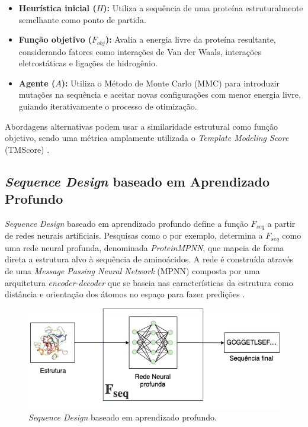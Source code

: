 \begin{itemize}
    \item \textbf{Heurística inicial ($H$):}  
    Utiliza a sequência de uma proteína estruturalmente semelhante como ponto de partida.

    \item \textbf{Função objetivo ($F_{obj}$):}  
    Avalia a energia livre da proteína resultante, considerando fatores como interações de Van der Waals,
    interações eletrostáticas e ligações de hidrogênio.

    \item \textbf{Agente ($A$):}  
    Utiliza o Método de Monte Carlo (MMC) para introduzir mutações na sequência e aceitar novas configurações com menor energia livre,
    guiando iterativamente o processo de otimização.
\end{itemize}

Abordagens alternativas podem usar a similaridade estrutural como função objetivo,
sendo uma métrica amplamente utilizada o \textit{Template Modeling Score} (TMScore) \cite{tmscore}.

\subsection{\textit{Sequence Design} baseado em Aprendizado Profundo}

\textit{Sequence Design} baseado em aprendizado profundo define a função $F_{seq}$ 
a partir de redes neurais artificiais. 
Pesquisas como o \cite{ProteinMPNN} por exemplo, 
determina a $F_{seq}$ como uma rede neural profunda, denominada \textit{ProteinMPNN}, 
que mapeia de forma direta a estrutura alvo à sequência de aminoácidos. 
A rede é construída através de uma \textit{Message Passing Neural Network} (MPNN) 
composta por uma arquitetura \textit{encoder-decoder} 
que se baseia nas características da estrutura como distância e orientação dos átomos no espaço 
para fazer predições \cite{ProteinMPNN}. 

\begin{figure}[H]
  \centering
  \includegraphics[width=.8\textwidth]{figuras/metodologia-DeepLearningBased.jpg}
  \caption{\textit{Sequence Design} baseado em aprendizado profundo.}
\end{figure}


